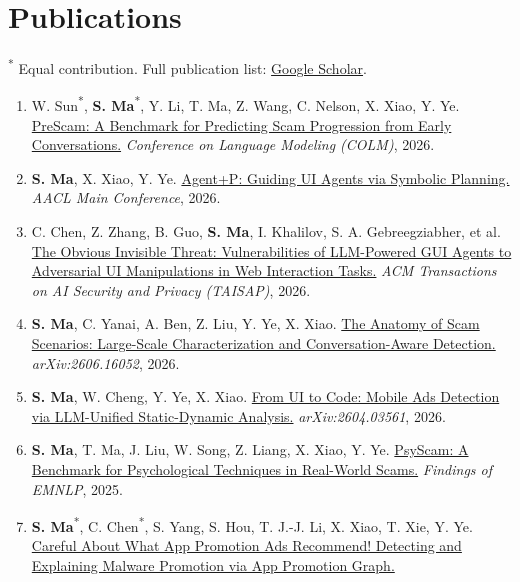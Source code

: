 \documentclass[10pt,letterpaper]{article}
\newenvironment{sectionbody}{\begin{list}{}{\setlength{\leftmargin}{12pt}\setlength{\rightmargin}{0pt}\setlength{\topsep}{0pt}\setlength{\partopsep}{0pt}\setlength{\parsep}{0pt}\setlength{\itemsep}{0pt}}\item[]}{\end{list}}
\newcommand{\me}{\textbf{S. Ma}}
\begin{document}
\section{Publications}
\begin{sectionbody}
\textsuperscript{*} Equal contribution. Full publication list: \href{https://scholar.google.com/citations?user=kF1a5fqkO_EC}{Google Scholar}.
\begin{enumerate}
\item\label{pub:prescam} W. Sun\textsuperscript{*}, \me\textsuperscript{*}, Y. Li, T. Ma, Z. Wang, C. Nelson, X. Xiao, Y. Ye.
\href{https://arxiv.org/abs/2605.12243}{PreScam: A Benchmark for Predicting Scam Progression from Early Conversations.}
\textit{Conference on Language Modeling (COLM)}, 2026.
\item\label{pub:agentp} \me, X. Xiao, Y. Ye.
\href{https://arxiv.org/abs/2510.06042}{Agent+P: Guiding UI Agents via Symbolic Planning.}
\textit{AACL Main Conference}, 2026.
\item\label{pub:fineprint} C. Chen, Z. Zhang, B. Guo, \me, I. Khalilov, S. A. Gebreegziabher, et al.
\href{https://doi.org/10.1145/3807953}{The Obvious Invisible Threat: Vulnerabilities of LLM-Powered GUI Agents to Adversarial UI Manipulations in Web Interaction Tasks.}
\textit{ACM Transactions on AI Security and Privacy (TAISAP)}, 2026.
\item\label{pub:scenarios} \me, C. Yanai, A. Ben, Z. Liu, Y. Ye, X. Xiao.
\href{https://arxiv.org/abs/2606.16052}{The Anatomy of Scam Scenarios: Large-Scale Characterization and Conversation-Aware Detection.}
\textit{arXiv:2606.16052}, 2026.
\item\label{pub:adwise} \me, W. Cheng, Y. Ye, X. Xiao.
\href{https://arxiv.org/abs/2604.03561}{From UI to Code: Mobile Ads Detection via LLM-Unified Static-Dynamic Analysis.}
\textit{arXiv:2604.03561}, 2026.
\item\label{pub:psyscam} \me, T. Ma, J. Liu, W. Song, Z. Liang, X. Xiao, Y. Ye.
\href{https://aclanthology.org/2025.findings-emnlp.675/}{PsyScam: A Benchmark for Psychological Techniques in Real-World Scams.}
\textit{Findings of EMNLP}, 2025.
\item\label{pub:adgpe} \me\textsuperscript{*}, C. Chen\textsuperscript{*}, S. Yang, S. Hou, T. J.-J. Li, X. Xiao, T. Xie, Y. Ye.
\href{https://www.ndss-symposium.org/ndss-paper/careful-about-what-app-promotion-ads-recommend-detecting-and-explaining-malware-promotion-via-app-promotion-graph/}{Careful About What App Promotion Ads Recommend! Detecting and Explaining Malware Promotion via App Promotion Graph.}

\end{enumerate}
\end{sectionbody}
\end{document}
